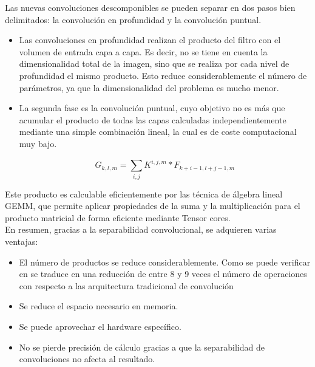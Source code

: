 Las nuevas convoluciones descomponibles se pueden separar en dos pasos bien delimitados: la convolución en profundidad y la convolución puntual.

\begin{itemize}
    \item Las convoluciones en profundidad realizan el producto del filtro con el volumen de entrada capa a capa. Es decir, no se tiene en cuenta la dimensionalidad total de la imagen, sino que se realiza por cada nivel de profundidad el mismo producto. Esto reduce considerablemente el número de parámetros, ya que la dimensionalidad del problema es mucho menor.
    \item La segunda fase es la convolución puntual, cuyo objetivo no es más que acumular el producto de todas las capas calculadas independientemente mediante una simple combinación lineal, la cual es de coste computacional muy bajo.
    
    $$G_{k,l,m} =  \sum_{i,j}^{} K^{i,j,m} * F_{k+i-1,l+j-1,m}$$
\end{itemize}

Este producto es calculable eficientemente por las técnica de álgebra lineal GEMM, que permite aplicar propiedades de la suma y la multiplicación para el producto matricial de forma eficiente mediante Tensor cores.\\

En resumen, gracias a la separabilidad convolucional, se adquieren varias ventajas:
\begin{itemize}
    \item El número de productos se reduce considerablemente. Como se puede verificar en \cite{howard2017mobilenets} se traduce en una reducción de entre 8 y 9 veces el número de operaciones con respecto a las arquitectura tradicional de convolución
    \item Se reduce el espacio necesario en memoria.
    \item Se puede aprovechar el hardware específico.
    \item No se pierde precisión de cálculo gracias a que la separabilidad de convoluciones no afecta al resultado.
\end{itemize}

